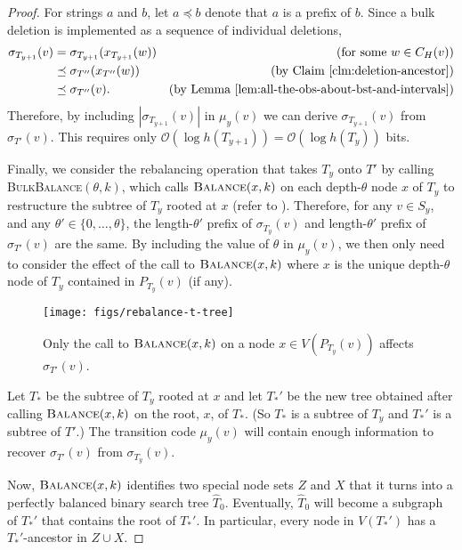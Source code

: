 \documentclass[kpfonts]{patmorin}
\newcommand{\Oh}{\mathcal{O}}
\begin{document}
\begin{proof}
  For strings $a$ and $b$, let $a\preceq b$ denote that $a$ is a prefix of $b$.
  Since a bulk deletion is implemented as a sequence of individual deletions,
  \begin{align*}
    \sigma_{T_{y+1}}(v)
      & = \sigma_{T_{y+1}}(x_{T_{y+1}}(w)) & \text{(for some $w\in C_H(v)$)} \\
      & \preceq \sigma_{T''}(x_{T''}(w)) & \text{(by \clmref{deletion-ancestor})} \\
      & \preceq \sigma_{T''}(v). & \text{(by \lemref{all-the-obs-about-bst-and-intervals})}
  \end{align*}
  Therefore, by including $|\sigma_{T_{y+1}}(v)|$ in $\mu_y(v)$ we can derive $\sigma_{T_{y+1}}(v)$ from $\sigma_{T'}(v)$.  This requires only $\Oh(\log h({T_{y+1}}))=\Oh(\log h({T_y}))$ bits.

  Finally, we consider the rebalancing operation that takes $T_y$ onto $T'$ by calling \textsc{BulkBalance}$(\theta,k)$, which calls $\textsc{Balance}(x,k)$ on each depth-$\theta$ node $x$ of $T_y$ to restructure the subtree of $T_y$ rooted at $x$ (refer to ). Therefore, for any $v\in S_y$, and any $\theta'\in\{0,\ldots,\theta\}$, the length-$\theta'$ prefix of $\sigma_{T_y}(v)$ and length-$\theta'$ prefix of $\sigma_{T'}(v)$ are the same.  By including the value of $\theta$ in $\mu_y(v)$, we then only need to consider the effect of the call to $\textsc{Balance}(x,k)$ where $x$ is the unique depth-$\theta$ node of $T_y$ contained in $P_{T_y}(v)$ (if any).

  \begin{figure}
    \begin{center}
      \texttt{[image: figs/rebalance-t-tree]}
    \end{center}
    \caption{Only the call to $\textsc{Balance}(x,k)$ on a node $x\in V(P_{T_y}(v))$ affects $\sigma_{T'}(v)$.}
  \end{figure}

  Let $T_*$ be the subtree of $T_y$ rooted at $x$ and let $T_*'$ be the new tree obtained after calling $\textsc{Balance}(x,k)$ on the root, $x$, of $T_*$. (So $T_*$ is a subtree of $T_y$ and $T_*'$ is a subtree of $T'$.)
  The transition code $\mu_y(v)$ will contain enough information to recover $\sigma_{T'}(v)$ from $\sigma_{T_y}(v)$.

  Now, $\textsc{Balance}(x,k)$ identifies two special node sets $Z$ and $X$ that it turns into a perfectly balanced binary search tree $\hat{T}_0$.  Eventually, $\hat{T}_0$ will become a subgraph of $T_*'$ that contains the root of $T_*'$.   In particular, every node in $V(T_*')$ has a $T_*'$-ancestor in $Z\cup X$.


\end{proof}
\end{document}
